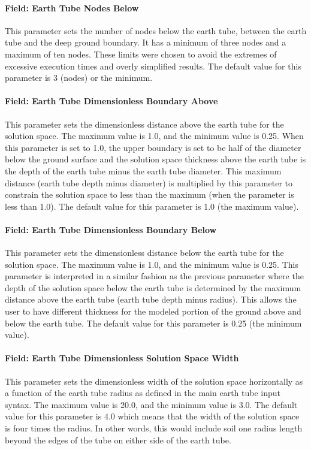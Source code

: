 \paragraph{Field: Earth Tube Nodes Below}\label{field-earth-tube-nodes-below}
This parameter sets the number of nodes below the earth tube, between the earth tube and the deep ground boundary.  It has a minimum of three nodes and a maximum of ten nodes.  These limits were chosen to avoid the extremes of excessive execution times and overly simplified results.  The default value for this parameter is 3 (nodes) or the minimum.

\paragraph{Field: Earth Tube Dimensionless Boundary Above}\label{field-earth-tube-dimensionless-boundary-above}
This parameter sets the dimensionless distance above the earth tube for the solution space.  The maximum value is 1.0, and the minimum value is 0.25.  When this parameter is set to 1.0, the upper boundary is set to be half of the diameter below the ground surface and the solution space thickness above the earth tube is the depth of the earth tube minus the earth tube diameter.  This maximum distance (earth tube depth minus diameter) is multiplied by this parameter to constrain the solution space to less than the maximum (when the parameter is less than 1.0).    The default value for this parameter is 1.0 (the maximum value).

\paragraph{Field: Earth Tube Dimensionless Boundary Below}\label{field-earth-tube-dimensionless-boundary-below}
This parameter sets the dimensionless distance below the earth tube for the solution space.  The maximum value is 1.0, and the minimum value is 0.25.  This parameter is interpreted in a similar fashion as the previous parameter where the depth of the solution space below the earth tube is determined by the maximum distance above the earth tube (earth tube depth minus radius).  This allows the user to have different thickness for the modeled portion of the ground above and below the earth tube.  The default value for this parameter is 0.25 (the minimum value).

\paragraph{Field: Earth Tube Dimensionless Solution Space Width}\label{field-earth-tube-dimensionless-solution-space-width}
This parameter sets the dimensionless width of the solution space horizontally as a function of the earth tube radius as defined in the main earth tube input syntax.  The maximum value is 20.0, and the minimum value is 3.0.  The default value for this parameter is 4.0 which means that the width of the solution space is four times the radius.  In other words, this would include soil one radius length beyond the edges of the tube on either side of the earth tube.


